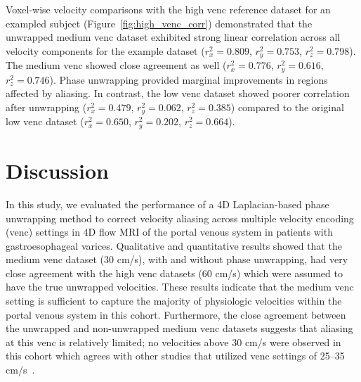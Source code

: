 Voxel-wise velocity comparisons with the high venc reference dataset for an exampled subject (Figure~\ref{fig:high_venc_corr}) demonstrated that the unwrapped medium venc dataset exhibited strong linear correlation across all velocity components for the example dataset ($r_x^2 = 0.809$, $r_y^2 = 0.753$, $r_z^2 = 0.798$). The medium venc showed close agreement as well ($r_x^2 = 0.776$, $r_y^2 = 0.616$, $r_z^2 = 0.746$). Phase unwrapping provided marginal improvements in regions affected by aliasing. In contrast, the low venc dataset showed poorer correlation after unwrapping ($r_x^2 = 0.479$, $r_y^2 = 0.062$, $r_z^2 = 0.385$) compared to the original low venc dataset ($r_x^2 = 0.650$, $r_y^2 = 0.202$, $r_z^2 = 0.664$).

\section{Discussion}\label{sec:gevenc_discussion}
In this study, we evaluated the performance of a 4D Laplacian-based phase unwrapping method to correct velocity aliasing across multiple velocity encoding (venc) settings in 4D flow MRI of the portal venous system in patients with gastroesophageal varices. Qualitative and quantitative results showed that the medium venc dataset (30 cm/s), with and without phase unwrapping, had very close agreement with the high venc datasets (60 cm/s) which were assumed to have the true unwrapped velocities. These results indicate that the medium venc setting is sufficient to capture the majority of physiologic velocities within the portal venous system in this cohort. Furthermore, the close agreement between the unwrapped and non-unwrapped medium venc datasets suggests that aliasing at this venc is relatively limited; no velocities above 30 cm/s were observed in this cohort which agrees with other studies that utilized venc settings of 25--35 cm/s~\cite{hyodo4DFlowMRI2022, motosugiFourdimensionalFlowMRI2019}. 

